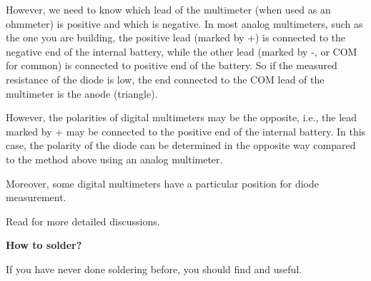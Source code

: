 However, we need to know which lead of the multimeter (when used as an ohmmeter) 
is positive and which is negative. In most analog multimeters, such as the one 
you are building, the positive lead (marked by +) is connected to the negative 
end of the internal battery, while the other lead (marked by -, or COM for common)
is connected to positive end of the battery. So if the measured resistance of the 
diode is low, the end connected to the COM lead of the multimeter is the anode
(triangle).

However, the polarities of digital multimeters may be the opposite, i.e., the 
lead marked by + may be connected to the positive end of the internal battery.
In this case, the polarity of the diode can be determined in the opposite way
compared to the method above using an analog multimeter. 

Moreover, some digital multimeters have a particular position for diode measurement. 

Read 
for more detailed discussions.

{\bf How to solder?} 

If you have never done soldering before, you should find 
and 
useful.


  



	

	

